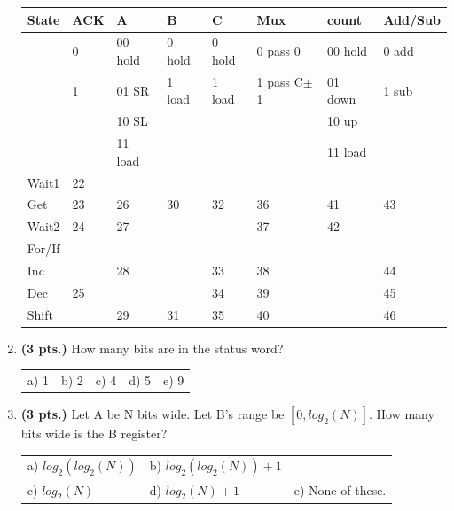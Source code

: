 \documentclass{article}
\begin{document}
\begin{enumerate}
\begin{tabular}{|l||l|l|l|l|l|l|l|}  \hline
State & ACK & A       & B      & C      & Mux        & count   & Add/Sub \\ \hline
      & 0   & 00 hold & 0 hold & 0 hold & 0 pass 0   & 00 hold & 0 add \\ \hline  
      & 1   & 01 SR   & 1 load & 1 load & 1 pass C$\pm$1 & 01 down & 1 sub \\ \hline  
      &     & 10 SL   &        &        &            & 10 up   &       \\ \hline  
      &     & 11 load &        &        &            & 11 load &       \\ \hline   \hline
Wait1 & 22  &         &        &        &            &         &       \\ \hline
Get   & 23  &  26     &  30    &  32    &  36        &  41     & 43    \\ \hline
Wait2 & 24  &  27     &        &        &  37        &  42     &       \\ \hline
For/If &    &         &        &        &            &         &       \\ \hline
Inc   &     &  28     &        &  33    &  38        &         & 44    \\ \hline
Dec   & 25  &         &        &  34    &  39        &         & 45    \\ \hline
Shift &     &  29     &  31    &  35    &  40        &         & 46    \\ \hline
\end{tabular}
\pagebreak
\setcounter{enumi}{46}
\item {\bf (3 pts.)} How many bits are in the status word?

\begin{tabular}{p{0.75in}p{0.75in}p{0.75in}p{0.75in}p{0.75in}}
a) 1 & b) 2 & c) 4 & d) 5 & e) 9 \\
\end{tabular}

\item {\bf (3 pts.)} Let A be N bits wide.  Let B's range be $[0,log_2(N)]$.
How many bits wide is the B register?

\begin{tabular}{p{1.30in}p{1.30in}p{2.00in}}
a) $log_2(log_2(N))$ & b) $log_2(log_2(N))+1$ &   \\
c) $log_2(N)$ & d) $log_2(N)+1$ & e) None of these.\\
\end{tabular}


\end{enumerate}
\end{document}
